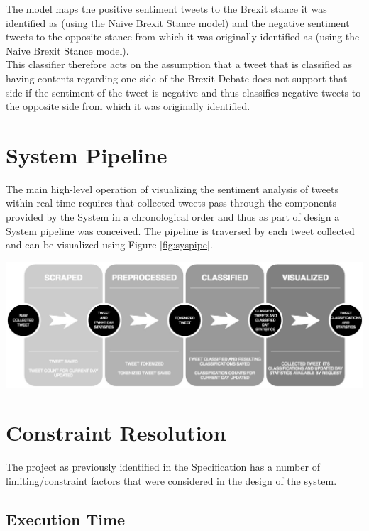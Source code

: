 \documentclass[11pt]{report}
\begin{document}
The model maps the positive sentiment tweets to the Brexit stance it was identified as
(using the Naive Brexit Stance model) and the negative sentiment tweets to the opposite
stance from which it was originally identified as (using the Naive Brexit Stance model).
\\

This classifier therefore acts on the assumption that a tweet that is classified as having
contents regarding one side of the Brexit Debate does not support that side if the sentiment
of the tweet is negative and thus classifies negative tweets to the opposite side from which
it was originally identified.

\clearpage

\section{System Pipeline}
The main high-level operation of visualizing the sentiment analysis of tweets within real time requires that collected tweets pass through the components provided by the System in a chronological order and thus as part of design a System pipeline was conceived. The pipeline is traversed by each tweet collected and can be visualized using Figure \ref{fig:syspipe}.

\begin{center}
  \includegraphics[width=\textwidth]{images/syspipe.jpg}
  \label{fig:syspipe}
\end{center}

\section{Constraint Resolution}

The project as previously identified in the Specification has a number of limiting/constraint factors that were considered in the design of the system. 

\subsection*{Execution Time} 
\end{document}
